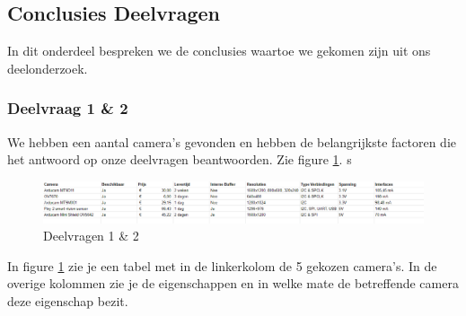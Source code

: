\documentclass{article}
\begin{document}
\subsection{Conclusies Deelvragen}
In dit onderdeel bespreken we de conclusies waartoe we gekomen zijn uit ons deelonderzoek.

\subsubsection{Deelvraag 1 {\&} 2}
We hebben een aantal camera's gevonden en hebben de belangrijkste factoren die het antwoord op onze deelvragen beantwoorden.
Zie figure \ref{fig:deelvragen1en2}.
s

\begin{figure}[h]
	\includegraphics[width=40em]{table2}
	\centering
	\caption{Deelvragen 1 {\&} 2}
	\label{fig:deelvragen1en2}
	\end{figure}

In figure \ref{fig:deelvragen1en2} zie je een tabel met in de linkerkolom de 5 gekozen camera's. In de overige kolommen zie je de eigenschappen en in welke mate de betreffende camera deze eigenschap bezit.
\end{document}
